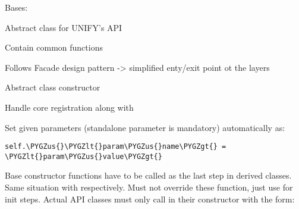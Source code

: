 \documentclass[letterpaper,10pt,english]{sphinxmanual}
\def\PYGZus{\char`\_}
\def\PYGZlt{\char`\<}
\def\PYGZgt{\char`\>}
\begin{document}
\begin{fulllineitems}
\label{util/api:escape.util.api.AbstractAPI}
Bases: 

Abstract class for UNIFY's API

Contain common functions

Follows Facade design pattern -\textgreater{} simplified enty/exit point ot the layers

\begin{fulllineitems}
\label{util/api:escape.util.api.AbstractAPI._core_name}
\end{fulllineitems}


\begin{fulllineitems}
\label{util/api:escape.util.api.AbstractAPI.dependencies}
\end{fulllineitems}


\begin{fulllineitems}
\label{util/api:escape.util.api.AbstractAPI.__init__}
Abstract class constructor

Handle core registration along with {\hyperref[util/api:escape.util.api.AbstractAPI._all_dependencies_met]{\emph{}}}

Set given parameters (standalone parameter is mandatory) automatically as:

\begin{Verbatim}[commandchars=\\\{\}]
self.\PYGZus{}\PYGZlt{}param\PYGZus{}name\PYGZgt{} = \PYGZlt{}param\PYGZus{}value\PYGZgt{}
\end{Verbatim}

Base constructor functions have to be called as the last step in derived
classes. Same situation with {\hyperref[util/api:escape.util.api.AbstractAPI._all_dependencies_met]{\emph{}}} respectively.
Must not override these function, just use {\hyperref[util/api:escape.util.api.AbstractAPI.initialize]{\emph{}}} for
init steps. Actual API classes must only call \href{https://docs.python.org/2.7/library/functions.html\#super}{} in their
constructor with the form:


\end{fulllineitems}
\end{fulllineitems}
\end{document}
